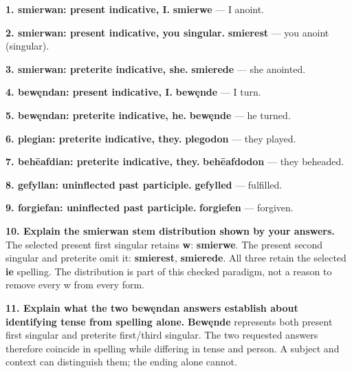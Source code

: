 \textbf{1. smierwan: present indicative, I.} \textbf{smierwe} — I anoint.

\textbf{2. smierwan: present indicative, you singular.} \textbf{smierest} — you anoint (singular).

\textbf{3. smierwan: preterite indicative, she.} \textbf{smierede} — she anointed.

\textbf{4. bewęndan: present indicative, I.} \textbf{bewęnde} — I turn.

\textbf{5. bewęndan: preterite indicative, he.} \textbf{bewęnde} — he turned.

\textbf{6. plegian: preterite indicative, they.} \textbf{plegodon} — they played.

\textbf{7. behēafdian: preterite indicative, they.} \textbf{behēafdodon} — they beheaded.

\textbf{8. gefyllan: uninflected past participle.} \textbf{gefylled} — fulfilled.

\textbf{9. forgiefan: uninflected past participle.} \textbf{forgiefen} — forgiven.

\textbf{10. Explain the smierwan stem distribution shown by your answers.} The selected present first singular retains \textbf{w}: \textbf{smierwe}. The present second singular and preterite omit it: \textbf{smierest}, \textbf{smierede}. All three retain the selected \textbf{ie} spelling. The distribution is part of this checked paradigm, not a reason to remove every w from every form.

\textbf{11. Explain what the two bewęndan answers establish about identifying tense from spelling alone.} \textbf{Bewęnde} represents both present first singular and preterite first/\allowbreak{}third singular. The two requested answers therefore coincide in spelling while differing in tense and person. A subject and context can distinguish them; the ending alone cannot.

